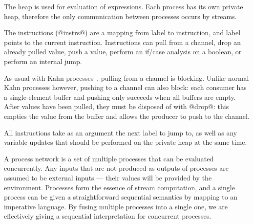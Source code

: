 The heap is used for evaluation of expressions.
Each process has its own private heap, therefore the only communication between processes occurs by streams.

The instructions (@instrs@) are a mapping from label to instruction, and label points to the current instruction.
Instructions can pull from a channel, drop an already pulled value, push a value, perform an if/case analysis on a boolean, or perform an internal jump.

As usual with Kahn processes~\cite{kahn1976coroutines}, pulling from a channel is blocking.
Unlike normal Kahn processes however, pushing to a channel can also block: each consumer has a single-element buffer and pushing only succeeds when all buffers are empty.
After values have been pulled, they must be disposed of with @drop@: this empties the value from the buffer and allows the producer to push to the channel.

All instructions take as an argument the next label to jump to, as well as any variable updates that should be performed on the private heap at the same time.

A process network is a set of multiple processes that can be evaluated concurrently.
Any inputs that are not produced as outputs of processes are assumed to be external inputs --- their values will be provided by the environment.
Processes form the essence of stream computation, and a single process can be given a straightforward sequential semantics by mapping to an imperative language.
By fusing multiple processes into a single one, we are effectively giving a sequential interpretation for concurrent processes.



